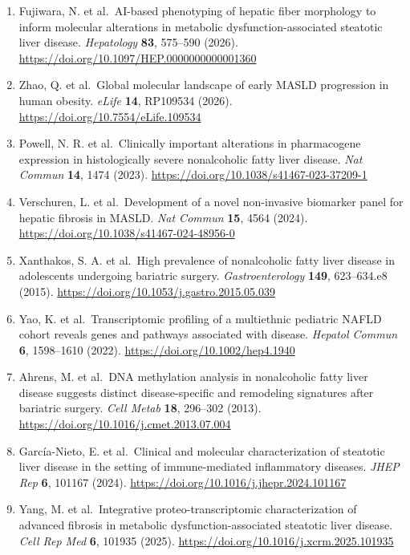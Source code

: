 \begin{enumerate}
  Fujiwara, N. et al.~Molecular signatures of long-term hepatocellular carcinoma risk in nonalcoholic fatty liver disease. \emph{Sci Transl Med} \textbf{14}, eabo4474 (2022). \url{https://doi.org/10.1126/scitranslmed.abo4474}
\item
  Fujiwara, N. et al.~AI-based phenotyping of hepatic fiber morphology to inform molecular alterations in metabolic dysfunction-associated steatotic liver disease. \emph{Hepatology} \textbf{83}, 575--590 (2026). \url{https://doi.org/10.1097/HEP.0000000000001360}
\item
  Zhao, Q. et al.~Global molecular landscape of early MASLD progression in human obesity. \emph{eLife} \textbf{14}, RP109534 (2026). \url{https://doi.org/10.7554/eLife.109534}
\item
  Powell, N. R. et al.~Clinically important alterations in pharmacogene expression in histologically severe nonalcoholic fatty liver disease. \emph{Nat Commun} \textbf{14}, 1474 (2023). \url{https://doi.org/10.1038/s41467-023-37209-1}
\item
  Verschuren, L. et al.~Development of a novel non-invasive biomarker panel for hepatic fibrosis in MASLD. \emph{Nat Commun} \textbf{15}, 4564 (2024). \url{https://doi.org/10.1038/s41467-024-48956-0}
\item
  Xanthakos, S. A. et al.~High prevalence of nonalcoholic fatty liver disease in adolescents undergoing bariatric surgery. \emph{Gastroenterology} \textbf{149}, 623--634.e8 (2015). \url{https://doi.org/10.1053/j.gastro.2015.05.039}
\item
  Yao, K. et al.~Transcriptomic profiling of a multiethnic pediatric NAFLD cohort reveals genes and pathways associated with disease. \emph{Hepatol Commun} \textbf{6}, 1598--1610 (2022). \url{https://doi.org/10.1002/hep4.1940}
\item
  Ahrens, M. et al.~DNA methylation analysis in nonalcoholic fatty liver disease suggests distinct disease-specific and remodeling signatures after bariatric surgery. \emph{Cell Metab} \textbf{18}, 296--302 (2013). \url{https://doi.org/10.1016/j.cmet.2013.07.004}
\item
  García-Nieto, E. et al.~Clinical and molecular characterization of steatotic liver disease in the setting of immune-mediated inflammatory diseases. \emph{JHEP Rep} \textbf{6}, 101167 (2024). \url{https://doi.org/10.1016/j.jhepr.2024.101167}
\item
  Yang, M. et al.~Integrative proteo-transcriptomic characterization of advanced fibrosis in metabolic dysfunction-associated steatotic liver disease. \emph{Cell Rep Med} \textbf{6}, 101935 (2025). \url{https://doi.org/10.1016/j.xcrm.2025.101935}

\end{enumerate}

